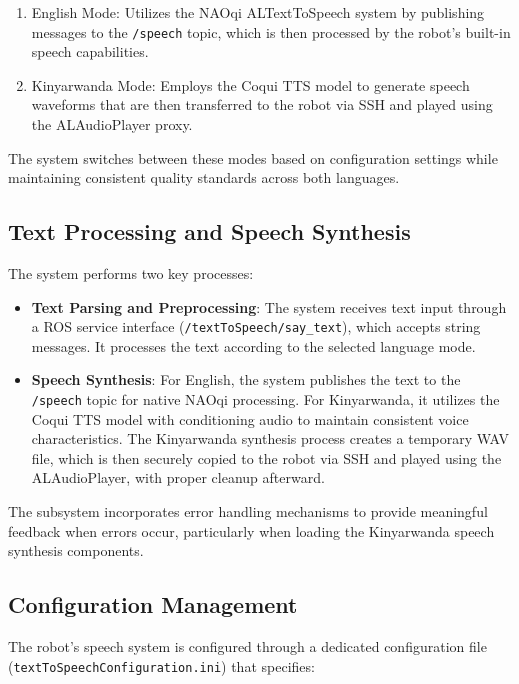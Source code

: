 \documentclass{CSSRforAfrica}
\begin{document}
\begin{enumerate}
    \item English Mode: Utilizes the NAOqi ALTextToSpeech system by publishing messages to the \texttt{/speech} topic, which is then processed by the robot's built-in speech capabilities.
    \item Kinyarwanda Mode: Employs the Coqui TTS model to generate speech waveforms that are then transferred to the robot via SSH and played using the ALAudioPlayer proxy.
\end{enumerate}

The system switches between these modes based on configuration settings while maintaining consistent quality standards across both languages.

\subsection{Text Processing and Speech Synthesis}
The system performs two key processes:

\begin{itemize}
    \item \textbf{Text Parsing and Preprocessing}: The system receives text input through a ROS service interface (\texttt{/textToSpeech/say\_text}), which accepts string messages. It processes the text according to the selected language mode.

    \item \textbf{Speech Synthesis}: For English, the system publishes the text to the \texttt{/speech} topic for native NAOqi processing. For Kinyarwanda, it utilizes the Coqui TTS model with conditioning audio to maintain consistent voice characteristics. The Kinyarwanda synthesis process creates a temporary WAV file, which is then securely copied to the robot via SSH and played using the ALAudioPlayer, with proper cleanup afterward.
\end{itemize}

The subsystem incorporates error handling mechanisms to provide meaningful feedback when errors occur, particularly when loading the Kinyarwanda speech synthesis components.

\newpage

\subsection{Configuration Management}
The robot's speech system is configured through a dedicated configuration file \\ (\texttt{textToSpeechConfiguration.ini}) that specifies:
\end{document}
